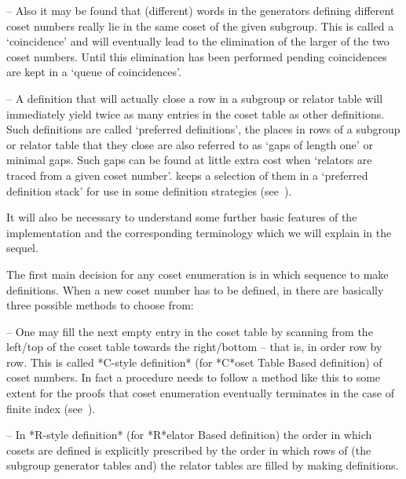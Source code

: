 \item{--}  Also  it  may  be  found  that  (different)  words  in  the
generators  defining different coset  numbers really  lie in  the same
coset of  the given subgroup.  This  is called a  \lq coincidence' and
will eventually lead to the elimination of the larger of the two coset
numbers.    Until  this   elimination  has   been   performed  pending
coincidences are kept in a \lq queue of coincidences'.

\item{--} A definition that will actually close a row in a subgroup or
relator  table will  immediately yield  twice as  many entries  in the
coset  table  as  other  definitions.   Such  definitions  are  called
\lq preferred definitions', the places in rows of a subgroup or relator
table that they close are also  referred to as \lq gaps of length one' 
or minimal gaps. Such gaps  can be  found  at little  extra cost  when
\lq relators  are traced  from a  given  coset number'. {\ACE} keeps a
selection of  them in a \lq preferred  definition stack'  for  use  in
some definition strategies (see~\cite{Hav91}).

\endlist

It will also be necessary to understand some further basic features of
the  implementation and  the corresponding  terminology which  we will
explain in the sequel.


The first main decision for any coset enumeration is in  which sequence
to  make definitions. When a new  coset number has to  be defined, in
{\ACE} there are basically three possible methods to choose from:

\beginlist

\item{--}  One  may fill  the  next empty  entry  in  the coset  table
by scanning     from the  left/top  of  the  coset table  towards  the
right/bottom -- that is, in order  row by row. This is called *C-style
definition* (for *C*oset Table Based definition) of coset numbers.  In
fact a procedure needs to follow a method like this to some extent for
the proofs that coset enumeration eventually terminates in the case of
finite index (see~\cite{Neu82}).

\item{--} In *R-style definition* (for *R*elator Based definition) the
order  in which  cosets are  defined is  explicitly prescribed  by the
order in which rows of (the subgroup generator tables and) the relator
tables are filled by making definitions.

